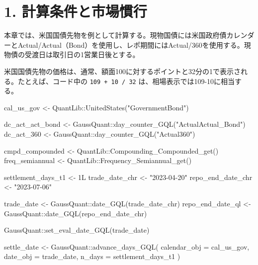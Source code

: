 \documentclass[
  letterpaper,
  DIV=11,
  numbers=noendperiod]{scrreprt}
\newenvironment{Shaded}{\begin{snugshade}}{\end{snugshade}}
\newcommand{\AttributeTok}[1]{\textcolor[rgb]{0.40,0.45,0.13}{#1}}
\newcommand{\DecValTok}[1]{\textcolor[rgb]{0.68,0.00,0.00}{#1}}
\newcommand{\FunctionTok}[1]{\textcolor[rgb]{0.28,0.35,0.67}{#1}}
\newcommand{\NormalTok}[1]{\textcolor[rgb]{0.00,0.23,0.31}{#1}}
\newcommand{\OtherTok}[1]{\textcolor[rgb]{0.00,0.23,0.31}{#1}}
\newcommand{\SpecialCharTok}[1]{\textcolor[rgb]{0.37,0.37,0.37}{#1}}
\newcommand{\StringTok}[1]{\textcolor[rgb]{0.13,0.47,0.30}{#1}}
\begin{document}
\section{1.
計算条件と市場慣行}\label{ux8a08ux7b97ux6761ux4ef6ux3068ux5e02ux5834ux6163ux884c}

本章では、米国国債先物を例として計算する。現物国債には米国政府債カレンダーとActual/Actual（Bond）を使用し、レポ期間にはActual/360を使用する。現物債の受渡日は取引日の1営業日後とする。

米国国債先物の価格は、通常、額面100に対するポイントと32分の1で表示される。たとえば、コード中の
\texttt{109\ +\ 10\ /\ 32} は、相場表示では109-10に相当する。

\begin{Shaded}
\begin{Highlighting}[]
\NormalTok{cal\_us\_gov }\OtherTok{\textless{}{-}}\NormalTok{ QuantLib}\SpecialCharTok{::}\FunctionTok{UnitedStates}\NormalTok{(}\StringTok{"GovernmentBond"}\NormalTok{)}

\NormalTok{dc\_act\_act\_bond }\OtherTok{\textless{}{-}}\NormalTok{ GaussQuant}\SpecialCharTok{::}\FunctionTok{day\_counter\_GQL}\NormalTok{(}\StringTok{"ActualActual\_Bond"}\NormalTok{)}
\NormalTok{dc\_act\_360 }\OtherTok{\textless{}{-}}\NormalTok{ GaussQuant}\SpecialCharTok{::}\FunctionTok{day\_counter\_GQL}\NormalTok{(}\StringTok{"Actual360"}\NormalTok{)}

\NormalTok{cmpd\_compounded }\OtherTok{\textless{}{-}}\NormalTok{ QuantLib}\SpecialCharTok{::}\FunctionTok{Compounding\_Compounded\_get}\NormalTok{()}
\NormalTok{freq\_semiannual }\OtherTok{\textless{}{-}}\NormalTok{ QuantLib}\SpecialCharTok{::}\FunctionTok{Frequency\_Semiannual\_get}\NormalTok{()}

\NormalTok{settlement\_days\_t1 }\OtherTok{\textless{}{-}} \DecValTok{1}\NormalTok{L}
\NormalTok{trade\_date\_chr }\OtherTok{\textless{}{-}} \StringTok{"2023{-}04{-}20"}
\NormalTok{repo\_end\_date\_chr }\OtherTok{\textless{}{-}} \StringTok{"2023{-}07{-}06"}

\NormalTok{trade\_date }\OtherTok{\textless{}{-}}\NormalTok{ GaussQuant}\SpecialCharTok{::}\FunctionTok{date\_GQL}\NormalTok{(trade\_date\_chr)}
\NormalTok{repo\_end\_date\_ql }\OtherTok{\textless{}{-}}\NormalTok{ GaussQuant}\SpecialCharTok{::}\FunctionTok{date\_GQL}\NormalTok{(repo\_end\_date\_chr)}

\NormalTok{GaussQuant}\SpecialCharTok{::}\FunctionTok{set\_eval\_date\_GQL}\NormalTok{(trade\_date)}

\NormalTok{settle\_date }\OtherTok{\textless{}{-}}\NormalTok{ GaussQuant}\SpecialCharTok{::}\FunctionTok{advance\_days\_GQL}\NormalTok{(}
  \AttributeTok{calendar\_obj =}\NormalTok{ cal\_us\_gov,}
  \AttributeTok{date\_obj =}\NormalTok{ trade\_date,}
  \AttributeTok{n\_days =}\NormalTok{ settlement\_days\_t1}
\NormalTok{)}


\end{Highlighting}
\end{Shaded}
\end{document}
